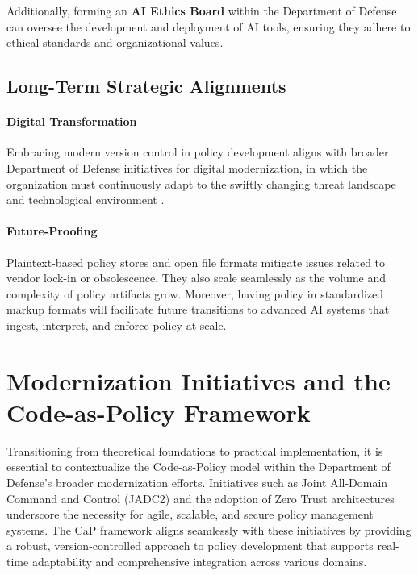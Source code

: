 \documentclass[11pt]{article}
\begin{document}
	Additionally, forming an \textbf{AI Ethics Board} within the Department of Defense can oversee the development and deployment of AI tools, ensuring they adhere to ethical standards and organizational values.

	\subsection{Long-Term Strategic Alignments}

	\paragraph{Digital Transformation}
	Embracing modern version control in policy development aligns with broader Department of Defense initiatives for digital modernization, in which the organization must continuously adapt to the swiftly changing threat landscape and technological environment \cite{DoDDigitalModernization2019}.

	\paragraph{Future-Proofing}
	Plaintext-based policy stores and open file formats mitigate issues related to vendor lock-in or obsolescence. They also scale seamlessly as the volume and complexity of policy artifacts grow. Moreover, having policy in standardized markup formats will facilitate future transitions to advanced AI systems that ingest, interpret, and enforce policy at scale.

	\section{Modernization Initiatives and the Code-as-Policy Framework}

	Transitioning from theoretical foundations to practical implementation, it is essential to contextualize the Code-as-Policy model within the Department of Defense's broader modernization efforts. Initiatives such as Joint All-Domain Command and Control (JADC2) and the adoption of Zero Trust architectures underscore the necessity for agile, scalable, and secure policy management systems. The CaP framework aligns seamlessly with these initiatives by providing a robust, version-controlled approach to policy development that supports real-time adaptability and comprehensive integration across various domains.
\end{document}
